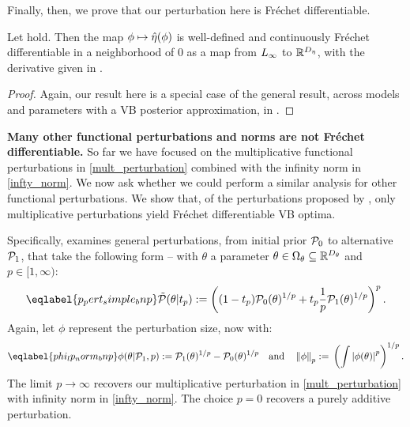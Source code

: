 Finally, then, we prove that our perturbation here is Fr{\'e}chet differentiable.
\begin{thm}
%
Let  hold.
%
%
Then the map $\phi \mapsto \hat\eta(\phi)$ is well-defined and continuously
Fr{\'e}chet differentiable in a neighborhood of $0$ as a map from ${L_{\infty}}$ to
$\mathbb{R}^{D_{\eta}}$, with the derivative given in .
\end{thm}
%
\begin{proof}
%
Again, our result here is a special case of the general result, across models
and parameters with a VB posterior approximation, in .
%
\end{proof}

\noindent \textbf{Many other functional perturbations and norms are not Fr{\'e}chet differentiable.}
%
So far we have focused on the multiplicative functional perturbations in
\eqref{mult_perturbation} combined with the infinity norm in \eqref{infty_norm}.
We now ask whether we could perform a similar analysis for other functional
perturbations. We show that, of the perturbations proposed by
\citet{gustafson:1996:local}, only multiplicative perturbations yield
Fr{\'e}chet differentiable VB optima.

Specifically, \citet{gustafson:1996:local} examines general perturbations, from
initial prior $\mathcal{P}_{0}$ to alternative $\mathcal{P}_{1}$, that take the following form --
with $\theta$ a parameter $\theta \in \Omega_{\theta} \subseteq
\mathbb{R}^{{D_{\theta}}}$ and $p \in [1, \infty)$:
%
\begin{align}\eqlabel{p_pert_simple_bnp}
%
\ptil(\theta \vert \tp) :=
    \left((1 - \tp)\pbase(\theta)^{1/p} +
    \tp \frac{1}{p}\palt(\theta)^{1/p} \right)^{p}.
%
\end{align}
%
Again, let $\phi$ represent the perturbation size, now with:
%
\begin{align}\eqlabel{phi_lp_norm_bnp}
%
\phi(\theta \vert \palt, p) :={}
    \palt(\theta)^{1/p} - \pbase(\theta)^{1/p} \mathand
\norm{\phi}_p :={} \left(\int \abs{\phi(\theta)}^p \right)^{1/p}.
%
\end{align}
%
The limit $p \rightarrow \infty$ recovers our multiplicative perturbation in
\eqref{mult_perturbation} with infinity norm in \eqref{infty_norm}. The choice
$p=0$ recovers a purely additive perturbation.

